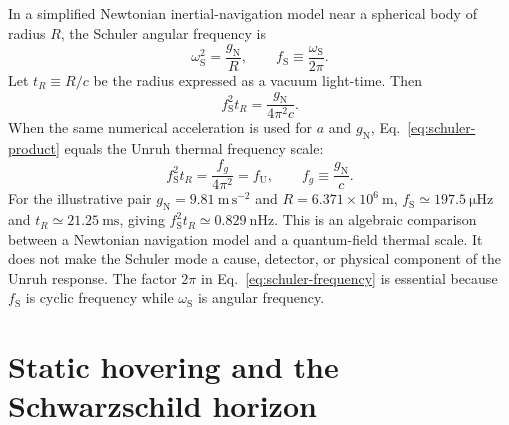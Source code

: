 \documentclass[12pt]{article}
\begin{document}
In a simplified Newtonian inertial-navigation model near a spherical body of radius $R$, the Schuler angular frequency is \cite{Schuler}
\begin{equation}
  \omega_{\mathrm{S}}^2=\frac{g_{\mathrm{N}}}{R},
  \qquad
  f_{\mathrm{S}}\equiv\frac{\omega_{\mathrm{S}}}{2\pi}.
  \label{eq:schuler-frequency}
\end{equation}
Let $t_R\equiv R/c$ be the radius expressed as a vacuum light-time. Then
\begin{equation}
  f_{\mathrm{S}}^2t_R
  =\frac{g_{\mathrm{N}}}{4\pi^2c}.
  \label{eq:schuler-product}
\end{equation}
When the same numerical acceleration is used for $a$ and $g_{\mathrm{N}}$, Eq.~\eqref{eq:schuler-product} equals the Unruh thermal frequency scale:
\begin{equation}
  f_{\mathrm{S}}^2t_R
  =\frac{f_g}{4\pi^2}
  =f_{\mathrm{U}},
  \qquad f_g\equiv\frac{g_{\mathrm{N}}}{c}.
  \label{eq:schuler-unruh-bridge}
\end{equation}
For the illustrative pair $g_{\mathrm{N}}=9.81\ \mathrm{m\,s^{-2}}$ and $R=6.371\times10^6\ \mathrm{m}$, $f_{\mathrm{S}}\simeq197.5\ \mathrm{\mu Hz}$ and $t_R\simeq21.25\ \mathrm{ms}$, giving $f_{\mathrm{S}}^2t_R\simeq0.829\ \mathrm{nHz}$. This is an algebraic comparison between a Newtonian navigation model and a quantum-field thermal scale. It does not make the Schuler mode a cause, detector, or physical component of the Unruh response. The factor $2\pi$ in Eq.~\eqref{eq:schuler-frequency} is essential because $f_{\mathrm{S}}$ is cyclic frequency while $\omega_{\mathrm{S}}$ is angular frequency.

\section{Static hovering and the Schwarzschild horizon}
\end{document}
